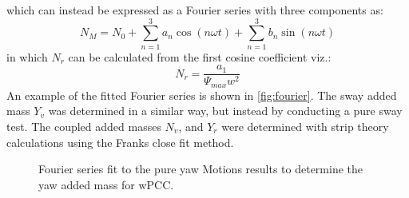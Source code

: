 \begin{equation}
    
    \label{eq:MOTIONS_N_expanded}
\end{equation}
which can instead be expressed as a Fourier series with three components as:
\begin{equation}
    N_M = N_0 + \sum_{n=1}^3a_n \cos(n \omega t) + \sum_{n=1}^3b_n \sin(n \omega t) 
    \label{eq:fourier}
\end{equation}
in which $N_{\dot{r}}$ can be calculated from the first cosine coefficient viz.:
\begin{equation}
    N_{\dot{r}} = \frac{a_1}{\Psi_{max} w^{2}}
    \label{eq:N_r1d}
\end{equation}
An example of the fitted Fourier series is shown in \autoref{fig:fourier}. The sway added mass $Y_{\dot{v}}$ was determined in a similar way, but instead by conducting a pure sway test. The coupled added masses $N_{\dot{v}}$, and $Y_{\dot{r}}$ were determined with strip theory calculations using the Franks close fit method. 
\begin{figure}[h!]
    \centering   
    \caption{Fourier series fit to the pure yaw Motions results to determine the yaw added mass for wPCC.}
    \label{fig:fourier}
\end{figure}